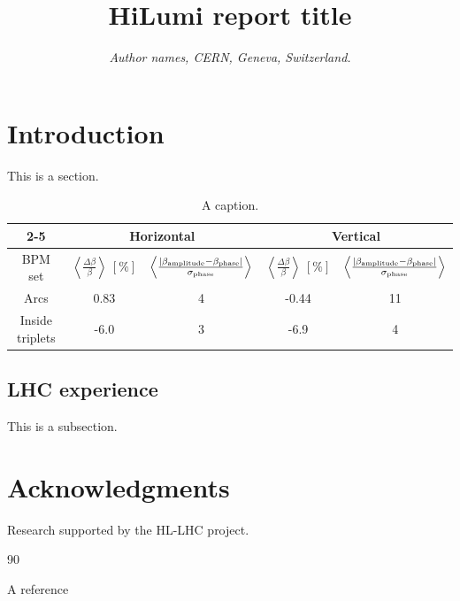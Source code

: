 \documentclass[]{HLreport}
\begin{document}
\title{HiLumi report title}

\author{\it Author names, CERN, Geneva, Switzerland.}


\maketitle

\tableofcontents


\section{Introduction}

This is a section.

\begin{table}
  \centering
    \begin{tabular}{|c|c|c|c|c|}
    \cline{2-5}
   \multicolumn{1}{c|}{} & \multicolumn{2}{c|}{Horizontal} & \multicolumn{2}{c|}{Vertical} \\
    \hline
    BPM set & $\left<\frac{\Delta \beta}{\beta}\right>\ [\%] $ & $\left<\frac{|\beta_{\textmd{amplitude}}-\beta_{\textmd{phase}}|}{\sigma_{\rm phase}}\right> $  & $\left<\frac{\Delta \beta}{\beta}\right>\ [\%] $   & $\left<\frac{|\beta_{\textmd{amplitude}}-\beta_{\textmd{phase}}|}{\sigma_{\rm phase}}\right> $ \\
    \hline
    Arcs  & 0.83  & 4  & -0.44  & 11 \\
    \hline
    Inside triplets  & -6.0 & 3 & -6.9 & 4 \\
    \hline
    \end{tabular}%
   \caption{A caption.}
  \label{tab:averagevsrms_beam1}%
\end{table}%

\subsection{LHC experience}

This is a subsection.

\section*{Acknowledgments}
 Research supported by the HL-LHC project.

\begin{thebibliography}{90}

 A reference

\end{thebibliography}
\end{document}
